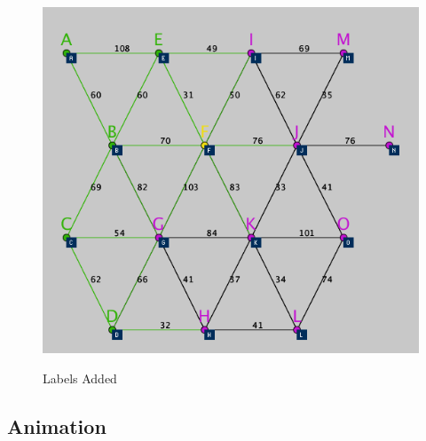 \documentclass[11pt,a4paper]{article}
\begin{document}
\begin{figure}[h]
	\centering
	\caption{Labels Added}
	\vspace{10pt}
	\includegraphics[scale=0.6]{graph3.png}
	\label{3}
\end{figure}

\subsection*{Animation}

\newpage


\end{document}
